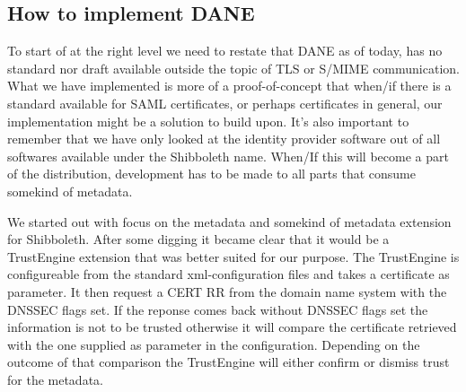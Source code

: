 \subsection{How to implement DANE}
To start of at the right level we need to restate that DANE as of today, has no standard nor draft available outside the topic of TLS or S/MIME communication.
What we have implemented is more of a proof-of-concept that when/if there is a standard available for SAML certificates, or perhaps certificates in general, our implementation might be a solution to build upon.
It's also important to remember that we have only looked at the identity provider software out of all softwares available under the Shibboleth name.
When/If this will become a part of the distribution, development has to be made to all parts that consume somekind of metadata.

We started out with focus on the metadata and somekind of metadata extension for Shibboleth.
After some digging it became clear that it would be a TrustEngine extension that was better suited for our purpose.
The TrustEngine is configureable from the standard xml-configuration files and takes a certificate as parameter.
It then request a CERT RR from the domain name system with the DNSSEC flags set. 
If the reponse comes back without DNSSEC flags set the information is not to be trusted otherwise it will compare the certificate retrieved with the one supplied as parameter in the configuration.
Depending on the outcome of that comparison the TrustEngine will either confirm or dismiss trust for the metadata.





